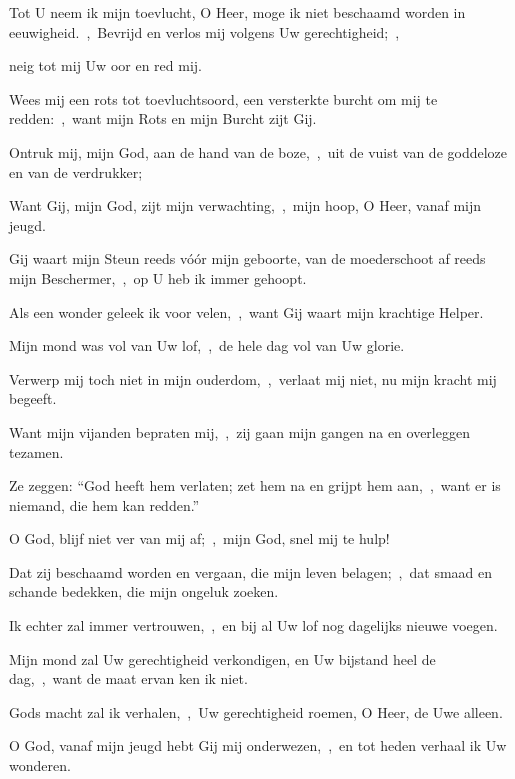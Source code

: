 \documentclass[12pt,twoside,a5paper]{article}
\begin{document}
\begin{halfparskip}

   Tot U neem ik mijn toevlucht, O Heer, moge ik niet beschaamd worden in eeuwigheid.~\sep\ Bevrijd en verlos mij volgens Uw gerechtigheid;~\sep


  neig tot mij Uw oor en red mij.

  Wees mij een rots tot toevluchtsoord, een versterkte burcht om mij te redden:~\sep\ want mijn Rots en mijn Burcht zijt Gij.

  Ontruk mij, mijn God, aan de hand van de boze,~\sep\ uit de vuist van de goddeloze en van de verdrukker;

  Want Gij, mijn God, zijt mijn verwachting,~\sep\ mijn hoop, O Heer, vanaf mijn jeugd.

  Gij waart mijn Steun reeds vóór mijn geboorte, van de moederschoot af reeds mijn Beschermer,~\sep\ op U heb ik immer gehoopt.

  Als een wonder geleek ik voor velen,~\sep\ want Gij waart mijn krachtige Helper.

  Mijn mond was vol van Uw lof,~\sep\ de hele dag vol van Uw glorie.

  Verwerp mij toch niet in mijn ouderdom,~\sep\ verlaat mij niet, nu mijn kracht mij begeeft.

  Want mijn vijanden bepraten mij,~\sep\ zij gaan mijn gangen na en overleggen tezamen.

  Ze zeggen: ``God heeft hem verlaten; zet hem na en grijpt hem aan,~\sep\ want er is niemand, die hem kan
  redden.''

  O God, blijf niet ver van mij af;~\sep\ mijn God, snel mij te hulp!

  Dat zij beschaamd worden en vergaan, die mijn leven belagen;~\sep\ dat smaad en schande bedekken, die mijn ongeluk zoeken.

  Ik echter zal immer vertrouwen,~\sep\ en bij al Uw lof nog dagelijks nieuwe voegen.

  Mijn mond zal Uw gerechtigheid verkondigen, en Uw bijstand heel de dag,~\sep\ want de maat ervan ken ik niet.

  Gods macht zal ik verhalen,~\sep\ Uw gerechtigheid roemen, O Heer, de Uwe alleen.

  O God, vanaf mijn jeugd hebt Gij mij onderwezen,~\sep\ en tot heden verhaal ik Uw wonderen.


\end{halfparskip}
\end{document}
